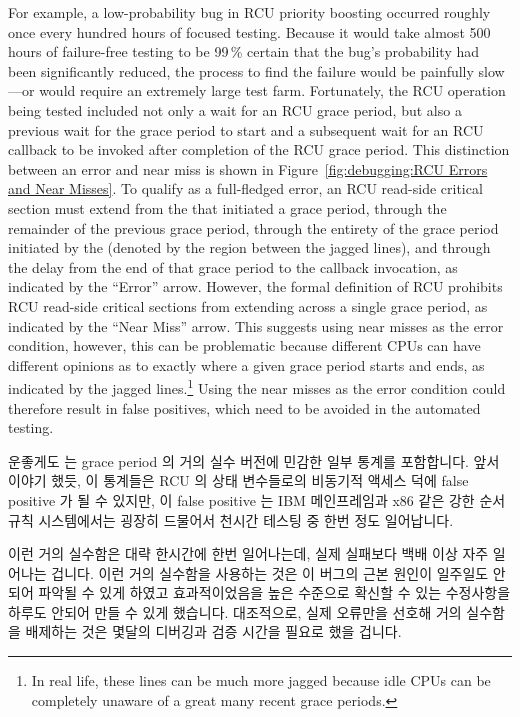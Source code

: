 For example, a low-probability bug in RCU priority boosting occurred
roughly once every hundred hours of focused  testing.
Because it would take almost 500 hours of failure-free testing to be
99\,\% certain that the bug's probability had been significantly reduced,
the  process
to find the failure would be painfully slow---or would require an extremely
large test farm.
Fortunately, the RCU operation being tested included not only a wait for
an RCU grace period, but also a previous wait for the grace period to start
and a subsequent wait for an RCU callback to be
invoked after completion of the RCU grace period.
This distinction between an  error and near miss is
shown in
Figure~\ref{fig:debugging:RCU Errors and Near Misses}.
To qualify as a full-fledged error, an RCU read-side critical section
must extend from the  that initiated a grace period,
through the remainder of the previous grace period, through the
entirety of the grace period initiated by the 
(denoted by the region between the jagged lines), and
through the delay from the end of that grace period to the callback
invocation, as indicated by the ``Error'' arrow.
However, the formal definition of RCU prohibits RCU read-side critical
sections from extending across a single grace period, as indicated by
the ``Near Miss'' arrow.
This suggests using near misses as the error condition, however, this
can be problematic because different CPUs can have different opinions
as to exactly where a given
grace period starts and ends, as indicated by the jagged lines.\footnote{
	In real life, these lines can be much more jagged because idle
	CPUs can be completely unaware of a great many recent grace
	periods.}
Using the near misses as the error condition could therefore result
in false positives, which need to be avoided in the automated
 testing.

\fi

운좋게도  는 grace period 의 거의 실수 버전에 민감한 일부 통계를
포함합니다.
앞서 이야기 했듯, 이 통계들은 RCU 의 상태 변수들로의 비동기적 액세스 덕에 false
positive 가 될 수 있지만, 이 false positive 는 IBM 메인프레임과 x86 같은 강한
순서 규칙 시스템에서는 굉장히 드물어서 천시간 테스팅 중 한번 정도 일어납니다.

이런 거의 실수함은 대략 한시간에 한번 일어나는데, 실제 실패보다 백배 이상 자주
일어나는 겁니다.
이런 거의 실수함을 사용하는 것은 이 버그의 근본 원인이 일주일도 안되어 파악될
수 있게 하였고 효과적이었음을 높은 수준으로 확신할 수 있는 수정사항을 하루도
안되어 만들 수 있게 했습니다.
대조적으로, 실제 오류만을 선호해 거의 실수함을 배제하는 것은 몇달의 디버깅과
검증 시간을 필요로 했을 겁니다.

